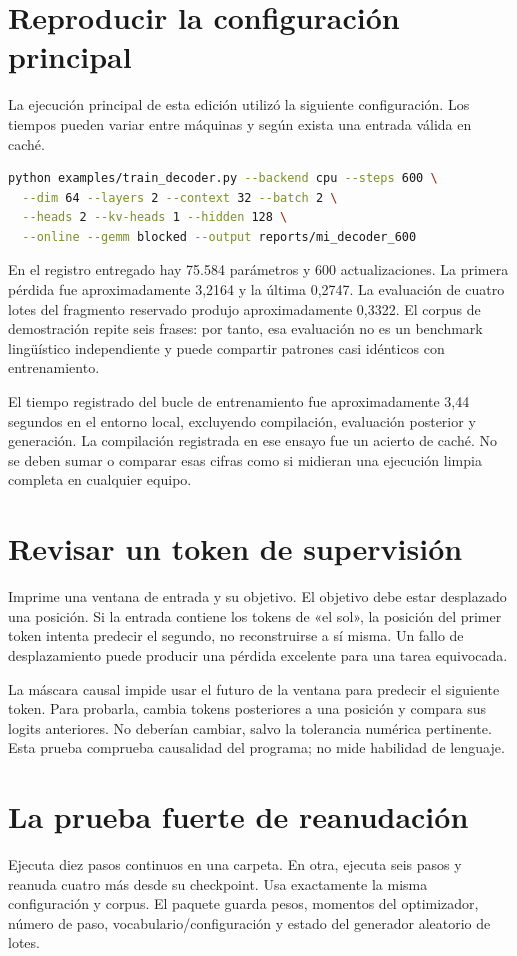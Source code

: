 \documentclass[12pt,a4paper,oneside]{report}
\begin{document}
\section{Reproducir la configuración principal}
La ejecución principal de esta edición utilizó la siguiente configuración. Los tiempos pueden variar entre máquinas y según exista una entrada válida en caché.

\begin{lstlisting}[language=bash]
python examples/train_decoder.py --backend cpu --steps 600 \
  --dim 64 --layers 2 --context 32 --batch 2 \
  --heads 2 --kv-heads 1 --hidden 128 \
  --online --gemm blocked --output reports/mi_decoder_600
\end{lstlisting}
En el registro entregado hay 75.584 parámetros y 600 actualizaciones. La primera pérdida fue aproximadamente 3,2164 y la última 0,2747. La evaluación de cuatro lotes del fragmento reservado produjo aproximadamente 0,3322. El corpus de demostración repite seis frases: por tanto, esa evaluación no es un benchmark lingüístico independiente y puede compartir patrones casi idénticos con entrenamiento.

El tiempo registrado del bucle de entrenamiento fue aproximadamente 3,44 segundos en el entorno local, excluyendo compilación, evaluación posterior y generación. La compilación registrada en ese ensayo fue un acierto de caché. No se deben sumar o comparar esas cifras como si midieran una ejecución limpia completa en cualquier equipo.

\section{Revisar un token de supervisión}
Imprime una ventana de entrada y su objetivo. El objetivo debe estar desplazado una posición. Si la entrada contiene los tokens de «el sol», la posición del primer token intenta predecir el segundo, no reconstruirse a sí misma. Un fallo de desplazamiento puede producir una pérdida excelente para una tarea equivocada.

La máscara causal impide usar el futuro de la ventana para predecir el siguiente token. Para probarla, cambia tokens posteriores a una posición y compara sus logits anteriores. No deberían cambiar, salvo la tolerancia numérica pertinente. Esta prueba comprueba causalidad del programa; no mide habilidad de lenguaje.

\section{La prueba fuerte de reanudación}
Ejecuta diez pasos continuos en una carpeta. En otra, ejecuta seis pasos y reanuda cuatro más desde su checkpoint. Usa exactamente la misma configuración y corpus. El paquete guarda pesos, momentos del optimizador, número de paso, vocabulario/configuración y estado del generador aleatorio de lotes.
\end{document}
